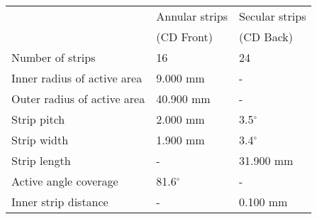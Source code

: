 \begin{tabular}{lll}
\hline
                            & Annular strips & Secular strips \\
		                    & (CD Front)     & (CD Back)      \\
\hline
Number of strips            & 16             & 24             \\
Inner radius of active area &  9.000 mm      & -              \\
Outer radius of active area & 40.900 mm      & -              \\
Strip pitch                 &  2.000 mm      & 3.5$^\circ$    \\
Strip width                 &  1.900 mm      & 3.4$^\circ$    \\
Strip length                &  -             & 31.900 mm      \\
Active angle coverage       & 81.6$^\circ$   & -              \\
Inner strip distance        &  -             & 0.100 mm       \\
\hline
\end{tabular}